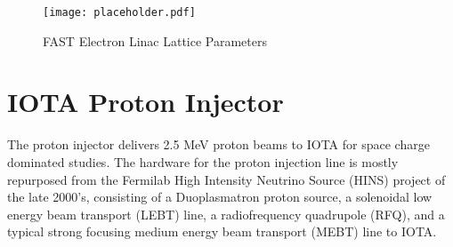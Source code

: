 \begin{figure}
	\centering
	\texttt{[image: placeholder.pdf]}
	\caption{FAST Electron Linac Lattice Parameters}
	\label{fig:linacLat}
\end{figure}

\section{IOTA Proton Injector}

The proton injector delivers 2.5 MeV proton beams to IOTA for space charge dominated studies. The hardware for the proton injection line is mostly repurposed from the Fermilab High Intensity Neutrino Source (HINS) \cite{webberHINS} project of the late 2000's, consisting of a Duoplasmatron proton source, a solenoidal low energy beam transport (LEBT) line, a radiofrequency quadrupole (RFQ), and a typical strong focusing medium energy beam transport (MEBT) line \cite{edstromIPI} to IOTA.

